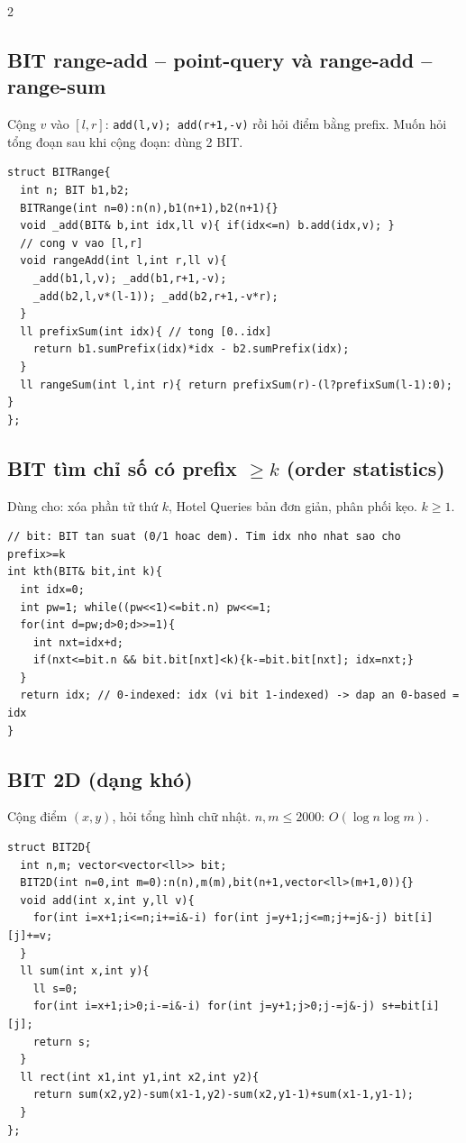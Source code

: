 \documentclass[8pt]{extarticle}
\begin{document}
\begin{multicols}{2}
\subsection{BIT range-add -- point-query và range-add -- range-sum}
Cộng $v$ vào $[l,r]$: \texttt{add(l,v); add(r+1,-v)} rồi hỏi điểm bằng prefix. Muốn hỏi tổng đoạn sau khi cộng đoạn: dùng 2 BIT.
\begin{lstlisting}
struct BITRange{
  int n; BIT b1,b2;
  BITRange(int n=0):n(n),b1(n+1),b2(n+1){}
  void _add(BIT& b,int idx,ll v){ if(idx<=n) b.add(idx,v); }
  // cong v vao [l,r]
  void rangeAdd(int l,int r,ll v){
    _add(b1,l,v); _add(b1,r+1,-v);
    _add(b2,l,v*(l-1)); _add(b2,r+1,-v*r);
  }
  ll prefixSum(int idx){ // tong [0..idx]
    return b1.sumPrefix(idx)*idx - b2.sumPrefix(idx);
  }
  ll rangeSum(int l,int r){ return prefixSum(r)-(l?prefixSum(l-1):0); }
};
\end{lstlisting}

\subsection{BIT tìm chỉ số có prefix $\ge k$ (order statistics)}
Dùng cho: xóa phần tử thứ $k$, Hotel Queries bản đơn giản, phân phối kẹo. $k\ge 1$.
\begin{lstlisting}
// bit: BIT tan suat (0/1 hoac dem). Tim idx nho nhat sao cho prefix>=k
int kth(BIT& bit,int k){
  int idx=0;
  int pw=1; while((pw<<1)<=bit.n) pw<<=1;
  for(int d=pw;d>0;d>>=1){
    int nxt=idx+d;
    if(nxt<=bit.n && bit.bit[nxt]<k){k-=bit.bit[nxt]; idx=nxt;}
  }
  return idx; // 0-indexed: idx (vi bit 1-indexed) -> dap an 0-based = idx
}
\end{lstlisting}

\subsection{BIT 2D (dạng khó)}
Cộng điểm $(x,y)$, hỏi tổng hình chữ nhật. $n,m\le 2000$: $O(\log n\log m)$.
\begin{lstlisting}
struct BIT2D{
  int n,m; vector<vector<ll>> bit;
  BIT2D(int n=0,int m=0):n(n),m(m),bit(n+1,vector<ll>(m+1,0)){}
  void add(int x,int y,ll v){
    for(int i=x+1;i<=n;i+=i&-i) for(int j=y+1;j<=m;j+=j&-j) bit[i][j]+=v;
  }
  ll sum(int x,int y){
    ll s=0;
    for(int i=x+1;i>0;i-=i&-i) for(int j=y+1;j>0;j-=j&-j) s+=bit[i][j];
    return s;
  }
  ll rect(int x1,int y1,int x2,int y2){
    return sum(x2,y2)-sum(x1-1,y2)-sum(x2,y1-1)+sum(x1-1,y1-1);
  }
};
\end{lstlisting}


\end{multicols}
\end{document}
